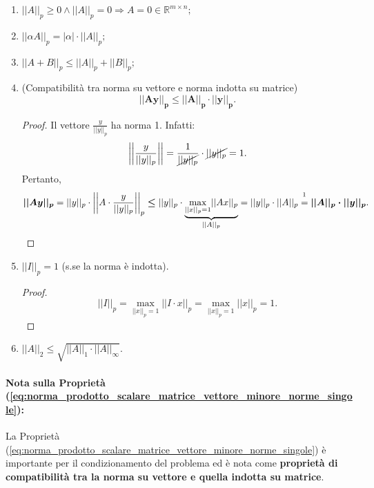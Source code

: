 \begin{property}\label{prop:norme_indotte_matrici}
	\begin{enumerate}
		\item $||A||_p\geq 0 \wedge ||A||_p=0 \Rightarrow A=0\in\mathbb{R}^{m\times n};$
		\item $||\alpha A||_p=|\alpha|\cdot||A||_p;$
		\item $||A+B||_p\leq||A||_p+||B||_p;$
		\item (Compatibilità tra norma su vettore e norma indotta su matrice)
		\begin{equation}\label{eq:norma_prodotto_scalare_matrice_vettore_minore_norme_singole}
			\boldsymbol{||Ay||_p\leq ||A||_p\cdot||y||_p}.
		\end{equation}
		\begin{proof}
			Il vettore $\frac{y}{||y||_p}$ ha norma 1. Infatti:
			\begin{equation}
				\left|\left|\frac{y}{||y||_p}\right|\right|=\frac{1}{\cancel{||y||_p}}\cdot\cancel{||y||_p}=1.
			\end{equation}
			Pertanto,
			\begin{equation*}
				\boldsymbol{||Ay||_p}=||y||_p\cdot\left|\left|A\cdot\frac{y}{||y||_p}\right|\right|_p\boldsymbol\leq ||y||_p\cdot\underbrace{\underset{||x||_p=1}{\max}||Ax||_p}_{||A||_p}=||y||_p\cdot||A||_p\overset{\footnotemark}{=}\boldsymbol{||A||_p\cdot||y||_p}.
			\end{equation*}
		\end{proof}
		\item $||I||_p=1$ (s.se la norma è indotta).
		\begin{proof}
			\begin{equation*}
				||I||_p=\underset{||x||_p=1}{\max}||I\cdot x||_p=\underset{||x||_p=1}{\max}||x||_p=1.
			\end{equation*}
		\end{proof}
		\item $||A||_2 \leq \sqrt{||A||_1\cdot ||A||_\infty}$.
	\end{enumerate}
\end{property}


\paragraph{Nota sulla Proprietà (\ref{eq:norma_prodotto_scalare_matrice_vettore_minore_norme_singole}):} La Proprietà (\ref{eq:norma_prodotto_scalare_matrice_vettore_minore_norme_singole}) è importante per il condizionamento del problema ed è nota come \textbf{proprietà di compatibilità tra la norma su vettore e quella indotta su matrice}.

